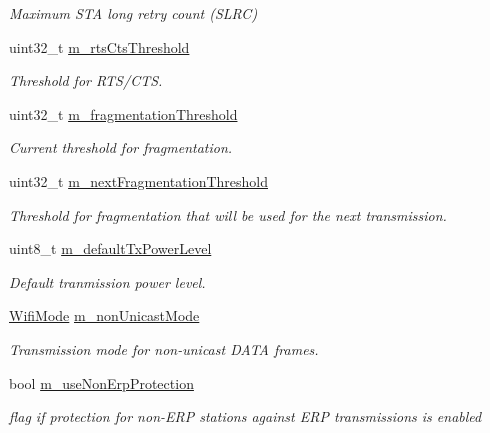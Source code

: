 \begin{DoxyCompactItemize}
\begin{DoxyCompactList}\small\item\em Maximum S\+TA long retry count (S\+L\+RC) \end{DoxyCompactList}\item 
uint32\+\_\+t \hyperlink{classns3_1_1WifiRemoteStationManager_af47323c64e4f6bb392fdd0c84764b26f}{m\+\_\+rts\+Cts\+Threshold}
\begin{DoxyCompactList}\small\item\em Threshold for R\+T\+S/\+C\+TS. \end{DoxyCompactList}\item 
uint32\+\_\+t \hyperlink{classns3_1_1WifiRemoteStationManager_a120ccbf05266fba8a7878fd913b2fec6}{m\+\_\+fragmentation\+Threshold}
\begin{DoxyCompactList}\small\item\em Current threshold for fragmentation. \end{DoxyCompactList}\item 
uint32\+\_\+t \hyperlink{classns3_1_1WifiRemoteStationManager_a0721fc3daa797288f93124860fb2afd3}{m\+\_\+next\+Fragmentation\+Threshold}
\begin{DoxyCompactList}\small\item\em Threshold for fragmentation that will be used for the next transmission. \end{DoxyCompactList}\item 
uint8\+\_\+t \hyperlink{classns3_1_1WifiRemoteStationManager_a6b41fa7af49c732cae53453284c9070f}{m\+\_\+default\+Tx\+Power\+Level}
\begin{DoxyCompactList}\small\item\em Default tranmission power level. \end{DoxyCompactList}\item 
\hyperlink{classns3_1_1WifiMode}{Wifi\+Mode} \hyperlink{classns3_1_1WifiRemoteStationManager_a713c2f64bf56c10372adef12988a2acf}{m\+\_\+non\+Unicast\+Mode}
\begin{DoxyCompactList}\small\item\em Transmission mode for non-\/unicast D\+A\+TA frames. \end{DoxyCompactList}\item 
bool \hyperlink{classns3_1_1WifiRemoteStationManager_af5192c20c737ca1b2f054914272c89f4}{m\+\_\+use\+Non\+Erp\+Protection}
\begin{DoxyCompactList}\small\item\em flag if protection for non-\/\+E\+RP stations against E\+RP transmissions is enabled \end{DoxyCompactList}\item 

\end{DoxyCompactItemize}
